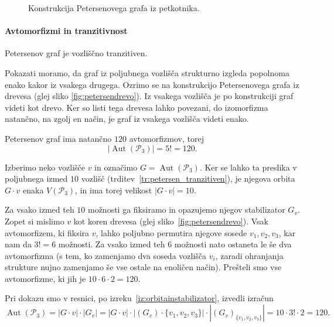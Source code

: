 \documentclass[fin1, tisk]{fmfdelo}
\newcommand{\PPP}{\mathscr{P}_3}
\newcommand{\aut}{\operatorname{Aut}}
\begin{document}
\begin{figure}[ht]
    \centering
    \def\svgwidth{\columnwidth}
    \caption{Konstrukcija Petersenovega grafa iz petkotnika.}
    \label{fig:petersenpetkotnik}
\end{figure}

\paragraph{Avtomorfizmi in tranzitivnost}


\begin{trditev}\label{tr:petersen_tranzitiven}
    Petersenov graf je vozliščno tranzitiven.
\end{trditev}
\begin{dokaz}
    Pokazati moramo, da graf iz poljubnega vozlišča strukturno izgleda popolnoma enako kakor iz vsakega drugega.
    Ozrimo se na konstrukcijo Petersenovega grafa iz drevesa (glej sliko \ref{fig:petersendrevo}). 
    Iz vsakega vozlišča je po konstrukciji graf videti kot drevo. Ker so listi tega drevesa 
    lahko povezani, do izomorfizma natančno, na zgolj en način, je graf iz vsakega vozlišča videti enako.
\end{dokaz}

\begin{trditev}
    Petersenov graf ima natančno $120$ avtomorfizmov, torej $$|\aut(\PPP)| = 5! = 120.$$
\end{trditev}

\begin{dokaz}
    Izberimo neko vozlišče $v$ in označimo $G=\aut(\PPP)$. Ker se lahko ta preslika v poljubnega izmed $10$ vozlišč (trditev~\ref{tr:petersen_tranzitiven}), je
    njegova orbita $G\cdot v$ enaka $V(\PPP)$, in ima torej velikost $|G\cdot v| = 10$.

    Za vsako izmed teh $10$ možnosti ga fiksiramo in opazujemo njegov stabilizator $G_v$.
    Zopet si mislimo $v$ kot koren drevesa (glej sliko~\ref{fig:petersendrevo}). Vsak avtomorfizem, ki
    fiksira $v$, lahko poljubno permutira njegove sosede $v_1, v_2, v_3$, kar nam da $3! = 6$ možnosti.
    Za vsako izmed teh $6$ možnosti nato ostaneta le še dva avtomorfizma (s tem, ko zamenjamo dva soseda vozlišča $v_i$, zaradi ohranjanja strukture
    nujno zamenjamo še vse ostale na enoličen način). Prešteli smo vse avtomorfizme, ki jih je $10\cdot 6 \cdot 2 = 120$.
\end{dokaz}
\begin{opomba}
    Pri dokazu smo v resnici, po izreku~\ref{iz:orbitainstabilizator}, izvedli izračun
    $$\aut(\PPP) = |G\cdot v|\cdot |G_v| = |G\cdot v|\cdot |(G_v)\cdot \{v_1, v_2, v_3\}| \cdot |(G_v)_{\{v_1, v_2, v_3\}}| = 10 \cdot 3! \cdot 2 = 120.$$
\end{opomba}
\end{document}
